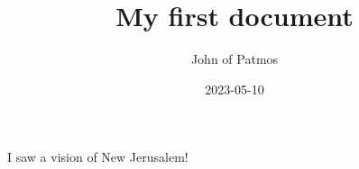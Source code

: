 \documentclass{article}
\title{My first document}
\date{2023-05-10}
\author{John of Patmos}
\begin{document}
\maketitle
\newpage
{}
I saw a vision of New Jerusalem!
\end{document}
